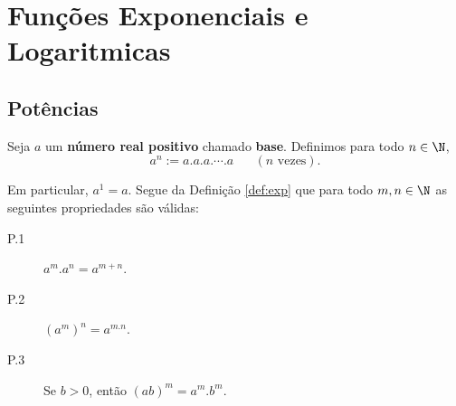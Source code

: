\chapter{Funções Exponenciais e Logaritmicas}
\section{Potências}

\begin{defin}\label{def:exp}
	Seja $a$ um \textbf{número real positivo} chamado \textbf{base}. Definimos para todo $n\in\N$,
	\[a^n:=a.a.a.\cdots.a \quad~~~(n\mbox{ vezes}).\]
\end{defin}

Em particular, $a^1=a$. Segue da Definição \ref{def:exp} que para todo $m,n\in\N$ as seguintes propriedades são válidas:
\begin{description}
	\item[P.1] $a^m.a^n=a^{m+n}.$
	\item[P.2] $(a^m)^n=a^{m.n}.$
	\item[P.3] Se $b>0$, então $(ab)^m=a^m.b^m.$
\end{description}

